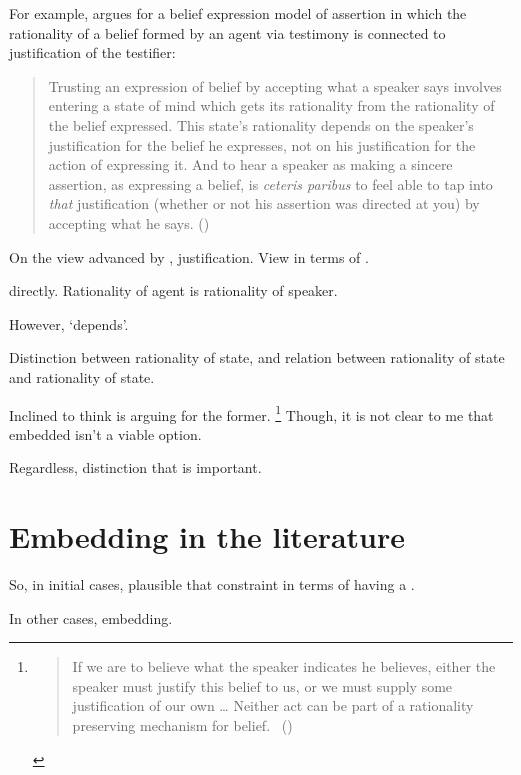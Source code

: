 \begin{note}
  For example, \citeauthor{Owens:2006tw} argues for a belief expression model of assertion in which the rationality of a belief formed by an agent via testimony is connected to justification of the testifier:

  \begin{quote}
    Trusting an expression of belief by accepting what a speaker says involves entering a state of mind which gets its rationality from the rationality of the belief expressed.
    This state's rationality depends on the speaker's justification for the belief he expresses, not on his justification for the action of expressing it.
    And to hear a speaker as making a sincere assertion, as expressing a belief, is \emph{ceteris paribus} to feel able to tap into \emph{that} justification (whether or not his assertion was directed at you) by accepting what he says.%
    \mbox{}\hfill\mbox{(\citeyear[123]{Owens:2006tw})}
  \end{quote}

  On the view advanced by \citeauthor{Owens:2006tw}, justification.
  View in terms of \support{}.

  \support{} directly.
  Rationality of agent is rationality of speaker.

  However, `depends'.

  Distinction between rationality of state, and relation between rationality of state and rationality of state.

  Inclined to think \citeauthor{Owens:2006tw} is arguing for the former.%
  \footnote{
    \begin{quote}
      If we are to believe what the speaker indicates he believes, either the speaker must justify this belief to us, or we must supply some justification of our own
      \dots
      Neither act can be part of a rationality preserving mechanism for belief.%
      \mbox{ }\hfill\mbox{(\citeyear[123--124]{Owens:2006tw})}
    \end{quote}
  }
  Though, it is not clear to me that embedded isn't a viable option.

  Regardless, distinction that is important.
\end{note}

\section{Embedding in the literature}
\label{cha:var:sec:embedding}

\begin{note}
  So, in initial cases, plausible that constraint in terms of having a \wit{}.

  In other cases, embedding.
\end{note}

